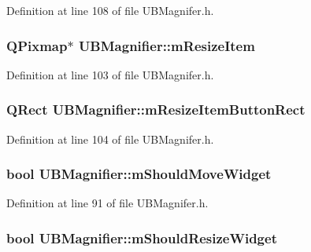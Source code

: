 Definition at line 108 of file U\-B\-Magnifer.\-h.

\hypertarget{class_u_b_magnifier_a61f9315c9b25c6c55a7bd49035dd9609}{
\subsubsection[{m\-Resize\-Item}]{\setlength{\rightskip}{0pt plus 5cm}Q\-Pixmap$\ast$ U\-B\-Magnifier\-::m\-Resize\-Item\hspace{0.3cm}{\ttfamily [protected]}}}\label{d4/d9d/class_u_b_magnifier_a61f9315c9b25c6c55a7bd49035dd9609}


Definition at line 103 of file U\-B\-Magnifer.\-h.

\hypertarget{class_u_b_magnifier_a846a06af56b76d504b01c425ccadfeca}{
\subsubsection[{m\-Resize\-Item\-Button\-Rect}]{\setlength{\rightskip}{0pt plus 5cm}Q\-Rect U\-B\-Magnifier\-::m\-Resize\-Item\-Button\-Rect\hspace{0.3cm}{\ttfamily [protected]}}}\label{d4/d9d/class_u_b_magnifier_a846a06af56b76d504b01c425ccadfeca}


Definition at line 104 of file U\-B\-Magnifer.\-h.

\hypertarget{class_u_b_magnifier_ade983c56155f2ab08934e39a8add9e65}{
\subsubsection[{m\-Should\-Move\-Widget}]{\setlength{\rightskip}{0pt plus 5cm}bool U\-B\-Magnifier\-::m\-Should\-Move\-Widget\hspace{0.3cm}{\ttfamily [protected]}}}\label{d4/d9d/class_u_b_magnifier_ade983c56155f2ab08934e39a8add9e65}


Definition at line 91 of file U\-B\-Magnifer.\-h.

\hypertarget{class_u_b_magnifier_a074638234ed5ecf0c5f4005dcf9263d7}{
\subsubsection[{m\-Should\-Resize\-Widget}]{\setlength{\rightskip}{0pt plus 5cm}bool U\-B\-Magnifier\-::m\-Should\-Resize\-Widget\hspace{0.3cm}{\ttfamily [protected]}}}\label{d4/d9d/class_u_b_magnifier_a074638234ed5ecf0c5f4005dcf9263d7}


